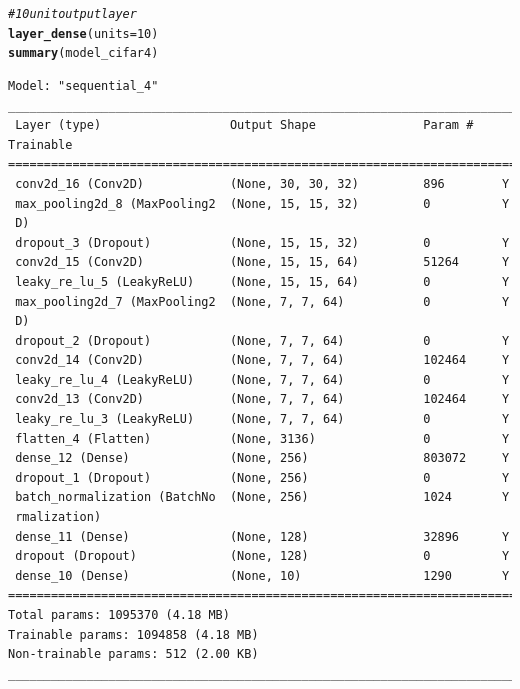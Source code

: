 \documentclass[10pt, a4paper, english]{article}\usepackage[]{graphicx}\usepackage[dvipsnames]{xcolor}
\makeatletter
\newcommand{\hlnum}[1]{\textcolor[rgb]{0.686,0.059,0.569}{#1}}%
\newcommand{\hlcom}[1]{\textcolor[rgb]{0.678,0.584,0.686}{\textit{#1}}}%
\newcommand{\hlstd}[1]{\textcolor[rgb]{0.345,0.345,0.345}{#1}}%
\newcommand{\hlkwc}[1]{\textcolor[rgb]{0.333,0.667,0.333}{#1}}%
\newcommand{\hlkwd}[1]{\textcolor[rgb]{0.737,0.353,0.396}{\textbf{#1}}}%
\newenvironment{kframe}{%
 \def\at@end@of@kframe{}%
 \ifinner\ifhmode%
  \def\at@end@of@kframe{\end{minipage}}%
  \begin{minipage}{\columnwidth}%
 \fi\fi%
 \def\FrameCommand##1{\hskip\@totalleftmargin \hskip-\fboxsep
 \colorbox{shadecolor}{##1}\hskip-\fboxsep
     \hskip-\linewidth \hskip-\@totalleftmargin \hskip\columnwidth}%
 \MakeFramed {\advance\hsize-\width
   \@totalleftmargin\z@ \linewidth\hsize
   \@setminipage}}%
 {\par\unskip\endMakeFramed%
 \at@end@of@kframe}
\newenvironment{knitrout}{}{} %
\makeatother
\begin{document}
\begin{knitrout}
\begin{kframe}
\begin{alltt}
  \hlcom{# 10 unit output layer}
  \hlkwd{layer_dense}\hlstd{(}\hlkwc{units} \hlstd{=} \hlnum{10}\hlstd{)}
\hlkwd{summary}\hlstd{(model_cifar4)}
\end{alltt}
\begin{verbatim}
Model: "sequential_4"
________________________________________________________________________________
 Layer (type)                  Output Shape               Param #    Trainable  
================================================================================
 conv2d_16 (Conv2D)            (None, 30, 30, 32)         896        Y          
 max_pooling2d_8 (MaxPooling2  (None, 15, 15, 32)         0          Y          
 D)                                                                             
 dropout_3 (Dropout)           (None, 15, 15, 32)         0          Y          
 conv2d_15 (Conv2D)            (None, 15, 15, 64)         51264      Y          
 leaky_re_lu_5 (LeakyReLU)     (None, 15, 15, 64)         0          Y          
 max_pooling2d_7 (MaxPooling2  (None, 7, 7, 64)           0          Y          
 D)                                                                             
 dropout_2 (Dropout)           (None, 7, 7, 64)           0          Y          
 conv2d_14 (Conv2D)            (None, 7, 7, 64)           102464     Y          
 leaky_re_lu_4 (LeakyReLU)     (None, 7, 7, 64)           0          Y          
 conv2d_13 (Conv2D)            (None, 7, 7, 64)           102464     Y          
 leaky_re_lu_3 (LeakyReLU)     (None, 7, 7, 64)           0          Y          
 flatten_4 (Flatten)           (None, 3136)               0          Y          
 dense_12 (Dense)              (None, 256)                803072     Y          
 dropout_1 (Dropout)           (None, 256)                0          Y          
 batch_normalization (BatchNo  (None, 256)                1024       Y          
 rmalization)                                                                   
 dense_11 (Dense)              (None, 128)                32896      Y          
 dropout (Dropout)             (None, 128)                0          Y          
 dense_10 (Dense)              (None, 10)                 1290       Y          
================================================================================
Total params: 1095370 (4.18 MB)
Trainable params: 1094858 (4.18 MB)
Non-trainable params: 512 (2.00 KB)
________________________________________________________________________________
\end{verbatim}
\end{kframe}
\end{knitrout}
\end{document}
